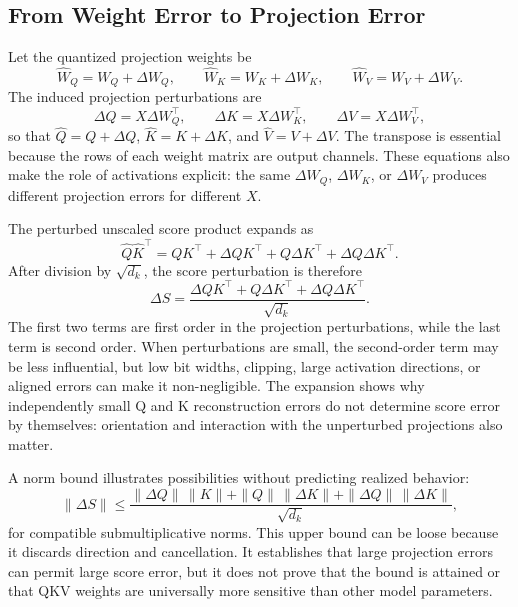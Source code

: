\subsection{From Weight Error to Projection Error}

Let the quantized projection weights be
\begin{equation}
\hat{W}_Q=W_Q+\Delta W_Q,\qquad
\hat{W}_K=W_K+\Delta W_K,\qquad
\hat{W}_V=W_V+\Delta W_V.
\end{equation}
The induced projection perturbations are
\begin{equation}
\Delta Q=X\Delta W_Q^\top,\qquad
\Delta K=X\Delta W_K^\top,\qquad
\Delta V=X\Delta W_V^\top,
\end{equation}
so that $\hat{Q}=Q+\Delta Q$, $\hat{K}=K+\Delta K$, and $\hat{V}=V+\Delta V$. The transpose is essential because the rows of each weight matrix are output channels. These equations also make the role of activations explicit: the same $\Delta W_Q$, $\Delta W_K$, or $\Delta W_V$ produces different projection errors for different $X$.

The perturbed unscaled score product expands as
\begin{equation}
\hat{Q}\hat{K}^\top
=QK^\top
+\Delta QK^\top
+Q\Delta K^\top
+\Delta Q\Delta K^\top.
\end{equation}
After division by $\sqrt{d_k}$, the score perturbation is therefore
\begin{equation}
\Delta S=
\frac{\Delta QK^\top+Q\Delta K^\top+\Delta Q\Delta K^\top}
{\sqrt{d_k}}.
\end{equation}
The first two terms are first order in the projection perturbations, while the last term is second order. When perturbations are small, the second-order term may be less influential, but low bit widths, clipping, large activation directions, or aligned errors can make it non-negligible. The expansion shows why independently small Q and K reconstruction errors do not determine score error by themselves: orientation and interaction with the unperturbed projections also matter.

A norm bound illustrates possibilities without predicting realized behavior:
\begin{equation}
\|\Delta S\|
\leq
\frac{
\|\Delta Q\|\,\|K\|
+\|Q\|\,\|\Delta K\|
+\|\Delta Q\|\,\|\Delta K\|
}{\sqrt{d_k}},
\end{equation}
for compatible submultiplicative norms. This upper bound can be loose because it discards direction and cancellation. It establishes that large projection errors can permit large score error, but it does not prove that the bound is attained or that QKV weights are universally more sensitive than other model parameters.

